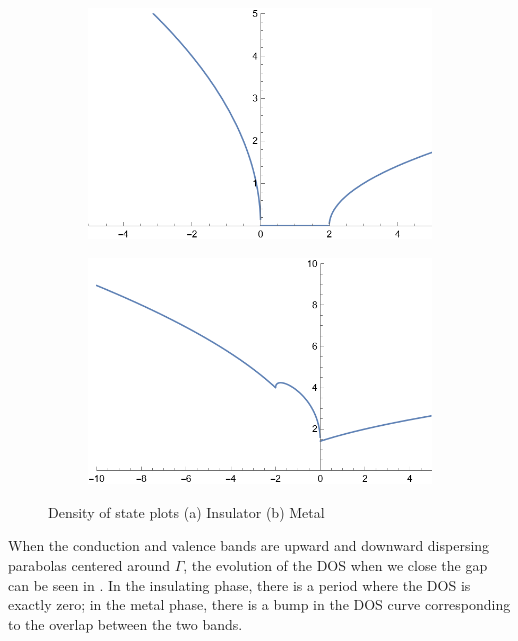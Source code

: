 \documentclass[hyperref, a4paper]{article}
\begin{document}
\begin{figure}
    \centering
    \begin{subfigure}{0.45\textwidth}
        \includegraphics[width=\textwidth]{plot/dos-insulator.png}
        \subcaption{}
    \end{subfigure}
    \begin{subfigure}{0.45\textwidth}
        \includegraphics[width=\textwidth]{plot/dos-metal.png}
        \subcaption{}
    \end{subfigure}
    \caption{Density of state plots (a) Insulator (b) Metal}
    \label{fig:dos}
\end{figure}

When the conduction and valence bands are upward and downward dispersing parabolas 
centered around $\Gamma$,
the evolution of the DOS when we close the gap 
can be seen in .
In the insulating phase, 
there is a period where the DOS is exactly zero;
in the metal phase, 
there is a bump in the DOS curve 
corresponding to the overlap between the two bands.
\end{document}

